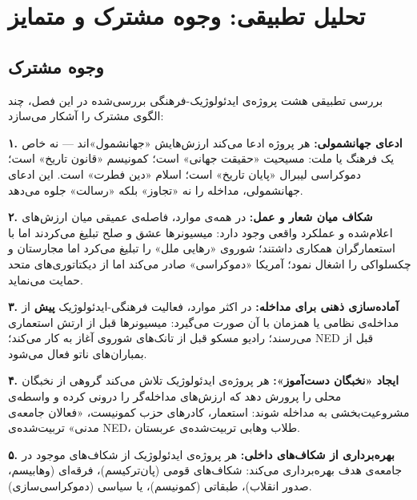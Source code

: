 \section{تحلیل تطبیقی: وجوه مشترک و متمایز}
\label{sec:ch13-comparative-analysis}

\subsection{وجوه مشترک}
\label{subsec:ch13-common}

بررسی تطبیقی هشت پروژه‌ی ایدئولوژیک-فرهنگی بررسی‌شده در این فصل، چند الگوی مشترک را آشکار می‌سازد:

\begin{tcolorbox}[wavebox, title={الگوهای مشترک پروژه‌های ایدئولوژیک}]
\textbf{۱. ادعای جهانشمولی:}
هر پروژه ادعا می‌کند ارزش‌هایش «جهانشمول»اند — نه خاص یک فرهنگ یا ملت: مسیحیت «حقیقت جهانی» است؛ کمونیسم «قانون تاریخ» است؛ دموکراسی لیبرال «پایان تاریخ» است؛ اسلام «دین فطرت» است. این ادعای جهانشمولی، مداخله را نه «تجاوز» بلکه «رسالت» جلوه می‌دهد.

\textbf{۲. شکاف میان شعار و عمل:}
در همه‌ی موارد، فاصله‌ی عمیقی میان ارزش‌های اعلام‌شده و عملکرد واقعی وجود دارد: میسیونرها عشق و صلح تبلیغ می‌کردند اما با استعمارگران همکاری داشتند؛ شوروی «رهایی ملل» را تبلیغ می‌کرد اما مجارستان و چکسلواکی را اشغال نمود؛ آمریکا «دموکراسی» صادر می‌کند اما از دیکتاتوری‌های متحد حمایت می‌نماید.

\textbf{۳. آماده‌سازی ذهنی برای مداخله:}
در اکثر موارد، فعالیت فرهنگی-ایدئولوژیک \textbf{پیش} از مداخله‌ی نظامی یا همزمان با آن صورت می‌گیرد: میسیونرها قبل از ارتش استعماری می‌رسند؛ رادیو مسکو قبل از تانک‌های شوروی آغاز به کار می‌کند؛ NED قبل از بمباران‌های ناتو فعال می‌شود.

\textbf{۴. ایجاد «نخبگان دست‌آموز»:}
هر پروژه‌ی ایدئولوژیک تلاش می‌کند گروهی از نخبگان محلی را پرورش دهد که ارزش‌های مداخله‌گر را درونی کرده و واسطه‌ی مشروعیت‌بخشی به مداخله شوند:  استعمار، کادرهای حزب کمونیست، «فعالان جامعه‌ی مدنی» تربیت‌شده‌ی NED، طلاب وهابی تربیت‌شده‌ی عربستان.

\textbf{۵. بهره‌برداری از شکاف‌های داخلی:}
هر پروژه‌ی ایدئولوژیک از شکاف‌های موجود در جامعه‌ی هدف بهره‌برداری می‌کند: شکاف‌های قومی (پان‌ترکیسم)، فرقه‌ای (وهابیسم، صدور انقلاب)، طبقاتی (کمونیسم)، یا سیاسی (دموکراسی‌سازی).
\end{tcolorbox}

